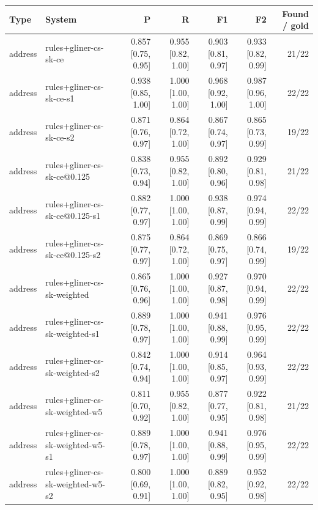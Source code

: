 \providecommand{\ci}[2]{{\scriptsize [#1, #2]}}

\begin{table}[htbp]
\centering
\small
\begin{tabular}{llrrrrr}
\toprule
Type & System & P & R & F1 & F2 & Found / gold \\
\midrule
address & rules+gliner-cs-sk-ce & 0.857 \ci{0.75}{0.95} & 0.955 \ci{0.82}{1.00} & 0.903 \ci{0.81}{0.97} & 0.933 \ci{0.82}{0.99} & 21/22 \\
address & rules+gliner-cs-sk-ce-s1 & 0.938 \ci{0.85}{1.00} & 1.000 \ci{1.00}{1.00} & 0.968 \ci{0.92}{1.00} & 0.987 \ci{0.96}{1.00} & 22/22 \\
address & rules+gliner-cs-sk-ce-s2 & 0.871 \ci{0.76}{0.97} & 0.864 \ci{0.72}{1.00} & 0.867 \ci{0.74}{0.97} & 0.865 \ci{0.73}{0.99} & 19/22 \\
address & rules+gliner-cs-sk-ce@0.125 & 0.838 \ci{0.73}{0.94} & 0.955 \ci{0.82}{1.00} & 0.892 \ci{0.80}{0.96} & 0.929 \ci{0.81}{0.98} & 21/22 \\
address & rules+gliner-cs-sk-ce@0.125-s1 & 0.882 \ci{0.77}{0.97} & 1.000 \ci{1.00}{1.00} & 0.938 \ci{0.87}{0.99} & 0.974 \ci{0.94}{0.99} & 22/22 \\
address & rules+gliner-cs-sk-ce@0.125-s2 & 0.875 \ci{0.77}{0.97} & 0.864 \ci{0.72}{1.00} & 0.869 \ci{0.75}{0.97} & 0.866 \ci{0.74}{0.99} & 19/22 \\
address & rules+gliner-cs-sk-weighted & 0.865 \ci{0.76}{0.96} & 1.000 \ci{1.00}{1.00} & 0.927 \ci{0.87}{0.98} & 0.970 \ci{0.94}{0.99} & 22/22 \\
address & rules+gliner-cs-sk-weighted-s1 & 0.889 \ci{0.78}{0.97} & 1.000 \ci{1.00}{1.00} & 0.941 \ci{0.88}{0.99} & 0.976 \ci{0.95}{0.99} & 22/22 \\
address & rules+gliner-cs-sk-weighted-s2 & 0.842 \ci{0.74}{0.94} & 1.000 \ci{1.00}{1.00} & 0.914 \ci{0.85}{0.97} & 0.964 \ci{0.93}{0.99} & 22/22 \\
address & rules+gliner-cs-sk-weighted-w5 & 0.811 \ci{0.70}{0.92} & 0.955 \ci{0.82}{1.00} & 0.877 \ci{0.77}{0.95} & 0.922 \ci{0.81}{0.98} & 21/22 \\
address & rules+gliner-cs-sk-weighted-w5-s1 & 0.889 \ci{0.78}{0.97} & 1.000 \ci{1.00}{1.00} & 0.941 \ci{0.88}{0.99} & 0.976 \ci{0.95}{0.99} & 22/22 \\
address & rules+gliner-cs-sk-weighted-w5-s2 & 0.800 \ci{0.69}{0.91} & 1.000 \ci{1.00}{1.00} & 0.889 \ci{0.82}{0.95} & 0.952 \ci{0.92}{0.98} & 22/22 \\

\end{tabular}
\end{table}
